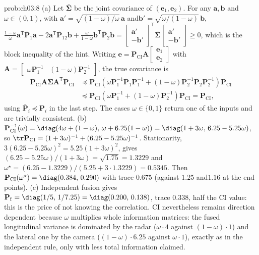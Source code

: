 \begin{sol}{prob:ch03:8}
(a) Let $\bar{\boldsymbol{\Sigma}}$ be the joint covariance of $(\mathbf{e}_1,\mathbf{e}_2)$. For any $\mathbf{a},\mathbf{b}$ and\allowbreak $\omega\in(0,1)$, with $\mathbf{a}'=\sqrt{(1-\omega)/\omega}\,\mathbf{a}$ and\allowbreak $\mathbf{b}'=\sqrt{\omega/(1-\omega)}\,\mathbf{b}$,
$\tfrac{1-\omega}{\omega}\mathbf{a}^{\mathsf T}\bar{\mathbf{P}}_1\mathbf{a}-2\mathbf{a}^{\mathsf T}\bar{\mathbf{P}}_{12}\mathbf{b}+\tfrac{\omega}{1-\omega}\mathbf{b}^{\mathsf T}\bar{\mathbf{P}}_2\mathbf{b}=\begin{bmatrix}\mathbf{a}'\\-\mathbf{b}'\end{bmatrix}^{\mathsf T}\bar{\boldsymbol{\Sigma}}\begin{bmatrix}\mathbf{a}'\\-\mathbf{b}'\end{bmatrix}\ge0$,
which is the block inequality of the hint. Writing $\mathbf{e}=\mathbf{P}_{\mathrm{CI}}\mathbf{A}\begin{bmatrix}\mathbf{e}_1\\ \mathbf{e}_2\end{bmatrix}$ with $\mathbf{A}=\begin{bmatrix}\omega\mathbf{P}_1^{-1}&(1-\omega)\mathbf{P}_2^{-1}\end{bmatrix}$, the true covariance is
\begin{align*}
\mathbf{P}_{\mathrm{CI}}\mathbf{A}\bar{\boldsymbol{\Sigma}}\mathbf{A}^{\mathsf T}\mathbf{P}_{\mathrm{CI}}
&\preceq\mathbf{P}_{\mathrm{CI}}\left(\omega\mathbf{P}_1^{-1}\bar{\mathbf{P}}_1\mathbf{P}_1^{-1}+(1-\omega)\mathbf{P}_2^{-1}\bar{\mathbf{P}}_2\mathbf{P}_2^{-1}\right)\mathbf{P}_{\mathrm{CI}}\\
&\preceq\mathbf{P}_{\mathrm{CI}}\left(\omega\mathbf{P}_1^{-1}+(1-\omega)\mathbf{P}_2^{-1}\right)\mathbf{P}_{\mathrm{CI}}=\mathbf{P}_{\mathrm{CI}},
\end{align*}
using $\bar{\mathbf{P}}_i\preceq\mathbf{P}_i$ in the last step. The cases $\omega\in\{0,1\}$ return one of the inputs and are trivially consistent.
(b) $\mathbf{P}_{\mathrm{CI}}^{-1}(\omega)=\diag(4\omega+(1-\omega),\,\omega+6.25(1-\omega))=\diag(1+3\omega,\,6.25-5.25\omega)$, so $\tr\mathbf{P}_{\mathrm{CI}}=(1+3\omega)^{-1}+(6.25-5.25\omega)^{-1}$. Stationarity, $3(6.25-5.25\omega)^{2}=5.25(1+3\omega)^{2}$, gives $(6.25-5.25\omega)/(1+3\omega)=\sqrt{1.75}=1.3229$ and\allowbreak $\omega^{\star}=(6.25-1.3229)/(5.25+3\cdot1.3229)=0.5345$. Then $\mathbf{P}_{\mathrm{CI}}(\omega^{\star})=\diag(0.384,\,0.290)$ with trace $0.675$ (against $1.25$ and\allowbreak $1.16$ at the end points).
(c) Independent fusion gives $\mathbf{P}_{\mathrm{f}}=\diag(1/5,\,1/7.25)=\diag(0.200,\,0.138)$, trace $0.338$, half the CI value: this is the price of not knowing the correlation. CI nevertheless remains direction dependent because $\omega$ multiplies whole information matrices: the fused longitudinal variance is dominated by the radar ($\omega\cdot4$ against $(1-\omega)\cdot1$) and the lateral one by the camera ($(1-\omega)\cdot6.25$ against $\omega\cdot1$), exactly as in the independent rule, only with less total information claimed.
\end{sol}

